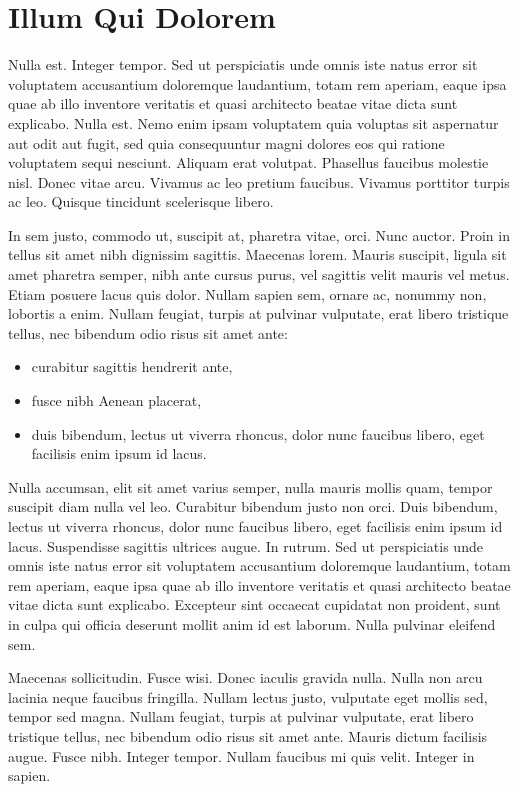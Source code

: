 \section{Illum Qui Dolorem}
Nulla est. Integer tempor. Sed ut perspiciatis unde omnis iste natus error sit voluptatem accusantium doloremque laudantium, totam rem aperiam, eaque ipsa quae ab illo inventore veritatis et quasi architecto beatae vitae dicta sunt explicabo. Nulla est. Nemo enim ipsam voluptatem quia voluptas sit aspernatur aut odit aut fugit, sed quia consequuntur magni dolores eos qui ratione voluptatem sequi nesciunt. Aliquam erat volutpat. Phasellus faucibus molestie nisl. Donec vitae arcu. Vivamus ac leo pretium faucibus. Vivamus porttitor turpis ac leo. Quisque tincidunt scelerisque libero.

In sem justo, commodo ut, suscipit at, pharetra vitae, orci. Nunc auctor. Proin in tellus sit amet nibh dignissim sagittis. Maecenas lorem. Mauris suscipit, ligula sit amet pharetra semper, nibh ante cursus purus, vel sagittis velit mauris vel metus. Etiam posuere lacus quis dolor. Nullam sapien sem, ornare ac, nonummy non, lobortis a enim. Nullam feugiat, turpis at pulvinar vulputate, erat libero tristique tellus, nec bibendum odio risus sit amet ante:
\begin{itemize}
	\item curabitur sagittis hendrerit ante,
	\item fusce nibh Aenean placerat,
	\item duis bibendum, lectus ut viverra rhoncus, dolor nunc faucibus libero, eget facilisis enim ipsum id lacus.
\end{itemize}
Nulla accumsan, elit sit amet varius semper, nulla mauris mollis quam, tempor suscipit diam nulla vel leo. Curabitur bibendum justo non orci. Duis bibendum, lectus ut viverra rhoncus, dolor nunc faucibus libero, eget facilisis enim ipsum id lacus. Suspendisse sagittis ultrices augue. In rutrum. Sed ut perspiciatis unde omnis iste natus error sit voluptatem accusantium doloremque laudantium, totam rem aperiam, eaque ipsa quae ab illo inventore veritatis et quasi architecto beatae vitae dicta sunt explicabo. Excepteur sint occaecat cupidatat non proident, sunt in culpa qui officia deserunt mollit anim id est laborum. Nulla pulvinar eleifend sem.

Maecenas sollicitudin. Fusce wisi. Donec iaculis gravida nulla. Nulla non arcu lacinia neque faucibus fringilla. Nullam lectus justo, vulputate eget mollis sed, tempor sed magna. Nullam feugiat, turpis at pulvinar vulputate, erat libero tristique tellus, nec bibendum odio risus sit amet ante. Mauris dictum facilisis augue. Fusce nibh. Integer tempor. Nullam faucibus mi quis velit. Integer in sapien.


